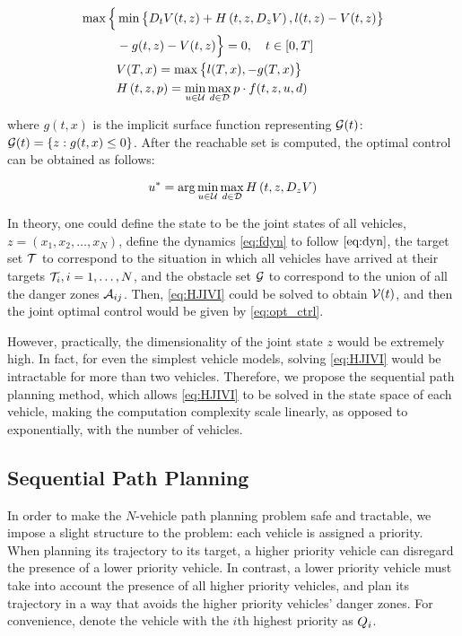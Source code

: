 \begin{equation}
\label{eq:HJIVI}
\begin{aligned}
\max\Big\{&\min\big\{D_t V(t, z) + H\left(t, z, D_z V\right), l(t,z) - V(t, z)\big\}\\
& -g(t, z) - V(t, z)\Big\} = 0, \quad t\in[0,T]\\
&V(T, x) = \max\big\{l(T, x), -g(T, x)\big\} \\
&H\left(t, z, p\right) = \min_{u \in \mathcal{U}} \max_{d \in \mathcal{D}} p \cdot f(t, z, u, d)
\end{aligned}
\end{equation}

\noindent where $g(t, x)$ is the implicit surface function representing $\mathcal{G}(t)$: $\mathcal{G}(t) = \{z: g(t, x) \le 0\}$. After the reachable set is computed, the optimal control can be obtained as follows:

\begin{equation}
\label{eq:opt_ctrl}
u^* = \arg \min_{u \in \mathcal{U}} \max_{d \in \mathcal{D}} H\left(t, z, D_z V\right)
\end{equation}

In theory, one could define the state to be the joint states of all vehicles, $z = (x_1, x_2, \ldots, x_N)$, define the dynamics \eqref{eq:fdyn} to follow $\eqref{eq:dyn}$, the target set $\mathcal{T}$ to correspond to the situation in which all vehicles have arrived at their targets $\mathcal{T}_i, i = 1, \ldots, N$, and the obstacle set $\mathcal{G}$ to correspond to the union of all the danger zones $\mathcal{A}_{ij}$. Then, \eqref{eq:HJIVI} could be solved to obtain $\mathcal{V}(t)$, and then the joint optimal control would be given by \eqref{eq:opt_ctrl}.

However, practically, the dimensionality of the joint state $z$ would be extremely high. In fact, for even the simplest vehicle models, solving \eqref{eq:HJIVI} would be intractable for more than two vehicles. Therefore, we propose the sequential path planning method, which allows \eqref{eq:HJIVI} to be solved in the state space of each vehicle, making the computation complexity scale linearly, as opposed to exponentially, with the number of vehicles.

\subsection{Sequential Path Planning}
In order to make the $N$-vehicle path planning problem safe and tractable, we impose a slight structure to the problem: each vehicle is assigned a priority. When planning its trajectory to its target, a higher priority vehicle can disregard the presence of a lower priority vehicle. In contrast, a lower priority vehicle must take into account the presence of all higher priority vehicles, and plan its trajectory in a way that avoids the higher priority vehicles' danger zones. For convenience, denote the vehicle with the $i$th highest priority as $Q_i$.

